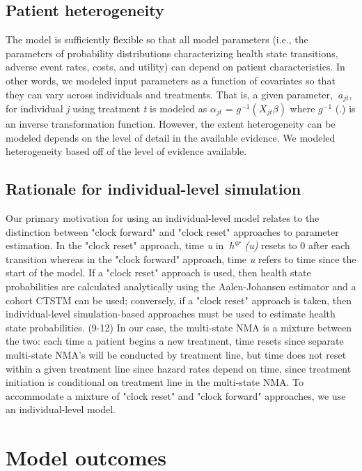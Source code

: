 \documentclass[11pt,final,fleqn]{article}\usepackage[]{graphicx}\usepackage[]{color}
\theoremstyle{plain}
\begin{document}
{\subsection{Patient heterogeneity}
The model is sufficiently flexible so that all model parameters (i.e., the parameters of probability distributions characterizing health state transitions, adverse event rates, costs, and utility) can depend on patient characteristics. In other words, we modeled input parameters as a function of covariates so that they can vary across individuals and treatments. That is, a given parameter, $\ a_{jt} $, for individual \textit{j} using treatment \textit{t} is modeled as $ \alpha_{jt} $ = $ \textit{g}^{-1} (X_{jt}\beta) $ where $ \textit{g}^{-1} $ (.) is an inverse transformation function. However, the extent heterogeneity can be modeled depends on the level of detail in the available evidence. We modeled heterogeneity based off of the level of evidence available. 

\subsection{Rationale for individual-level simulation}

Our primary motivation for using an individual-level model relates to the distinction between "clock forward" and "clock reset" approaches to parameter estimation. In the "clock reset" approach, time \textit{u} in $\ h^{qr} $ \textit{(u)} resets to 0 after each transition whereas in the "clock forward" approach, time \textit{u} refers to time since the start of the model. If a "clock reset" approach is used, then health state probabilities are calculated analytically using the Aalen-Johansen estimator and a cohort CTSTM can be used; conversely, if a "clock reset" approach is taken, then individual-level simulation-based approaches must be used to estimate health state probabilities. (9-12) In our case, the multi-state NMA is a mixture between the two: each time a patient begins a new treatment, time resets since separate multi-state NMA's will be conducted by treatment line, but time does not reset within a given treatment line since hazard rates depend on time, since treatment initiation is conditional on treatment line in the multi-state NMA. To accommodate a mixture of "clock reset" and "clock forward" approaches, we use an individual-level model. 

\section{Model outcomes}\label{sec:model-outcomes}

}
\end{document}
